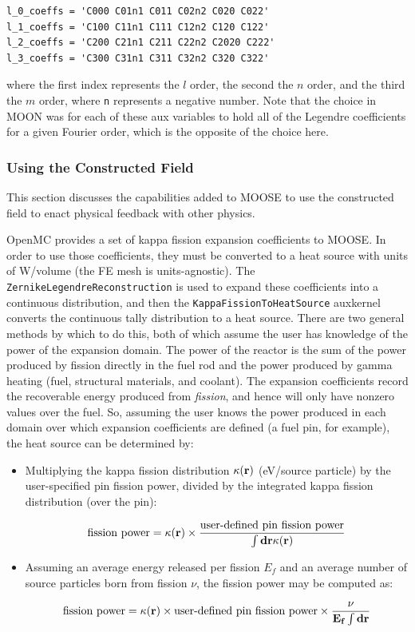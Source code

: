 \documentclass[10pt]{article}
\newcommand{\beq}{\begin{equation}}
\newcommand{\eeq}{\end{equation}}
\newcounter{subsubsubsection}[subsubsection]
\numberwithin{equation}{section} %
\begin{document}
\begin{lstlisting}
l_0_coeffs = 'C000 C01n1 C011 C02n2 C020 C022'
l_1_coeffs = 'C100 C11n1 C111 C12n2 C120 C122'
l_2_coeffs = 'C200 C21n1 C211 C22n2 C2020 C222'
l_3_coeffs = 'C300 C31n1 C311 C32n2 C320 C322'
\end{lstlisting}

where the first index represents the \(l\) order, the second the \(n\) order, and the third the \(m\) order, where {\tt n} represents a negative number. Note that the choice in MOON was for each of these aux variables to hold all of the Legendre coefficients for a given Fourier order, which is the opposite of the choice here. 

\subsubsection{Using the Constructed Field}
This section discusses the capabilities added to MOOSE to use the constructed field to enact physical feedback with other physics.

OpenMC provides a set of kappa fission expansion coefficients to MOOSE. In order to use those coefficients, they must be converted to a heat source with units of W/volume (the FE mesh is units-agnostic). The {\tt ZernikeLegendreReconstruction} is used to expand these coefficients into a continuous distribution, and then the {\tt KappaFissionToHeatSource} auxkernel converts the continuous tally distribution to a heat source. There are two general methods by which to do this, both of which assume the user has knowledge of the power of the expansion domain. The power of the reactor is the sum of the power produced by fission directly in the fuel rod and the power produced by gamma heating (fuel, structural materials, and coolant). The expansion coefficients record the recoverable energy produced from {\it fission}, and hence will only have nonzero values over the fuel. So, assuming the user knows the power produced in each domain over which expansion coefficients are defined (a fuel pin, for example), the heat source can be determined by: 

\begin{itemize}
\item Multiplying the kappa fission distribution \(\kappa(\bf{r})\) (eV/source particle) by the user-specified pin fission power, divided by the integrated kappa fission distribution (over the pin):

\beq
\textrm{fission power}=\kappa(\bf{r})\times\frac{\textrm{user-defined pin fission power}}{\int d\bf{r}\kappa({\bf r})}
\eeq

\item Assuming an average energy released per fission \(E_f\) and an average number of source particles born from fission \(\nu\), the fission power may be computed as:

\beq
\textrm{fission power}=\kappa(\bf{r})\times\textrm{user-defined pin fission power}\times\frac{\nu}{E_f\int d\textbf{r}}
\eeq
\end{itemize}
\end{document}
